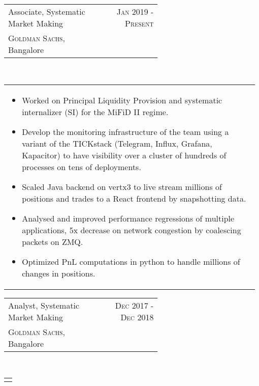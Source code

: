 \documentclass[a4paper]{article} %
\newcommand{\verticalspacing}{-0.25cm}
\newcommand{\bulletspace}{0.7cm}
\newcommand{\projectheadspacing}{6.9cm}
\newcommand{\cproject}[5]{%
    \begin{tabular}{p{0.60\linewidth}r}
        \textcolor{NavyBlue}{\small #2} & \multicolumn{1}{m{ \projectheadspacing{} }}{\raggedleft \small {\textsc{#1}}}\\
        \small {#3} & \small {#4}
    \end{tabular}\\
    \begin{tabular}{p{0.98\linewidth}}
    \vspace{-0.3cm}
        \small{#5}
    \end{tabular}
    \vspace{\verticalspacing{}}
}
\begin{document}
\cproject
      {Jan 2019 - Present}
      {Associate, Systematic Market Making}
      {\textsc{Goldman Sachs}, Bangalore}
      {}
      {%
        \begin{itemize}[leftmargin=\bulletspace{}]
          \item Worked on Principal Liquidity Provision and systematic internalizer (SI) for the MiFiD II regime.
          \item Develop the monitoring infrastructure of the team using a variant of the TICKstack
              (Telegram, Influx, Grafana, Kapacitor) to have visibility over a cluster of hundreds of
              processes on tens of deployments.
          \item Scaled Java backend on vertx3 to live stream millions of positions
              and trades to a React frontend by snapshotting data.
          \item Analysed and improved performance regressions of multiple applications,
              5x decrease on network congestion by coalescing packets on ZMQ.
          \item Optimized PnL computations in python to handle millions of changes in positions.
        \end{itemize}
      }

\cproject
      {Dec 2017 - Dec 2018}
      {Analyst, Systematic Market Making}
      {\textsc{Goldman Sachs}, Bangalore}
      {}
      {%
      }
\end{document}
